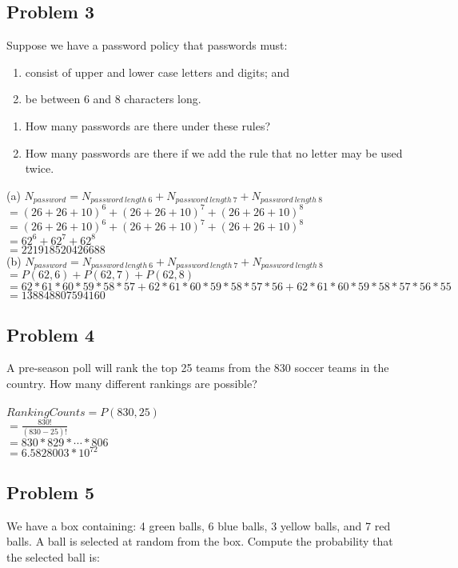 \documentclass[paper=a4, fontsize=11pt]{scrartcl} %
\numberwithin{equation}{section} %
\numberwithin{figure}{section} %
\newcommand{\problem}[1]{\subsection *{Problem #1}}
\begin{document}
\problem 3 Suppose we have a password policy that passwords must:
\begin{enumerate}
\item consist of upper and lower case letters and digits; and
\item be between 6 and 8 characters long.
\end{enumerate}

\renewcommand{\labelenumi}{(\alph{enumi})}
\begin{enumerate}
\item How many passwords are there under these rules?
\item How many passwords are there if we add the rule that no letter may be used twice.
\end{enumerate}
(a)
$N_{password} = N_{password\ length\ 6} + N_{password\ length\ 7} + N_{password\ length\ 8}$\\
$= (26 + 26 + 10)^{6} +(26 + 26 + 10)^{7}+(26 + 26 + 10)^{8}$\\
$= (26 + 26 + 10)^{6} +(26 + 26 + 10)^{7}+(26 + 26 + 10)^{8}$\\
$= 62^6 + 62^7 + 62^8$\\
$= 221918520426688$\\

(b)
$N_{password} = N_{password\ length\ 6} + N_{password\ length\ 7} + N_{password\ length\ 8}$\\
$= P(62, 6) + P(62, 7) + P(62, 8)$\\
$= 62 * 61 * 60 * 59 * 58 * 57 +  62 * 61 * 60 * 59 * 58 * 57 * 56 +  62 * 61 * 60 * 59 * 58 * 57 * 56 * 55$\\
$= 138848807594160$\\

\problem 4 A pre-season poll will rank the top 25 teams from the 830 soccer
teams in the country. How many different rankings are possible?\\\\
$Ranking Counts = P(830, 25)$\\
$= \frac{830!}{(830-25)!}$\\
$= 830 * 829 * \cdots * 806$\\
$= 6.5828003 * 10^{72}$\\

\problem 5 We have a box containing: 4 green balls, 6 blue balls, 3 yellow balls,
and 7 red balls. A ball is selected at random from the box. Compute
the probability that the selected ball is:\\\\
\end{document}

